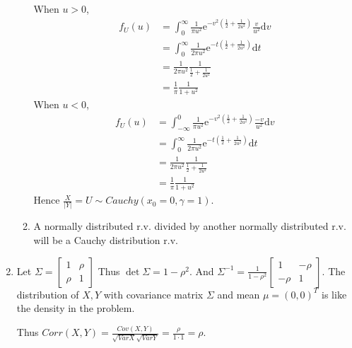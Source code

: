 \documentclass{article}
\begin{document}
\begin{enumerate}[leftmargin = 0 em, label = \arabic*., font = \bfseries]
\begin{enumerate}
When $u > 0$, 
\begin{align*}
f_U (u) &= \int_{0}^\infty \frac{1}{\pi u^2} \mathrm{e}^{-v^2 (\frac{1}{2} + \frac{1}{2 u^2})}\frac{v}{u^2}\mathrm{d}v\\
& = \int_{0}^\infty \frac{1}{2 \pi u^2} \mathrm{e}^{-t (\frac{1}{2} + \frac{1}{2 u^2})}\mathrm{d}t\\
& = \frac{1}{2 \pi u^2} \frac{1}{\frac{1}{2} + \frac{1}{2 u^2}}\\
& = \frac{1}{\pi} \frac{1}{1 +u^2}
\end{align*}
When $u < 0$,
\begin{align*}
f_U (u) &= \int_{-\infty}^0 \frac{1}{\pi u^2} \mathrm{e}^{-v^2 (\frac{1}{2} + \frac{1}{2 u^2})}\frac{-v}{u^2}\mathrm{d}v\\
& = \int_{0}^\infty \frac{1}{2 \pi u^2} \mathrm{e}^{-t (\frac{1}{2} + \frac{1}{2 u^2})}\mathrm{d}t\\
& = \frac{1}{2 \pi u^2} \frac{1}{\frac{1}{2} + \frac{1}{2 u^2}}\\
& = \frac{1}{\pi} \frac{1}{1 +u^2}
\end{align*}
Hence $\frac{X}{|Y|} = U \sim Cauchy(x_0 = 0, \gamma = 1)$.


\item 
A normally distributed r.v. divided by another normally distributed r.v. will be a Cauchy distribution r.v.
\end{enumerate}


\item 
Let $\Sigma = \begin{bmatrix}
	1 & \rho\\
	\rho & 1
\end{bmatrix}$ Thus $\det \Sigma = 1 - \rho^2$. And $\Sigma^{-1} = \frac{1}{1 - \rho^2} \begin{bmatrix}
	1 & -\rho\\
	-\rho & 1
\end{bmatrix}$. The distribution of $X, Y$ with covariance matrix $\Sigma$ and mean $ \mu = (0,0)^{T}$ is like the density in the problem.

Thus $Corr(X,Y) = \frac{Cov(X,Y)}{\sqrt{Var{X}}\sqrt{Var{Y}}} = \frac{\rho}{1 \cdot 1} = \rho.$
 	\end{enumerate}



	
	
\end{document}
